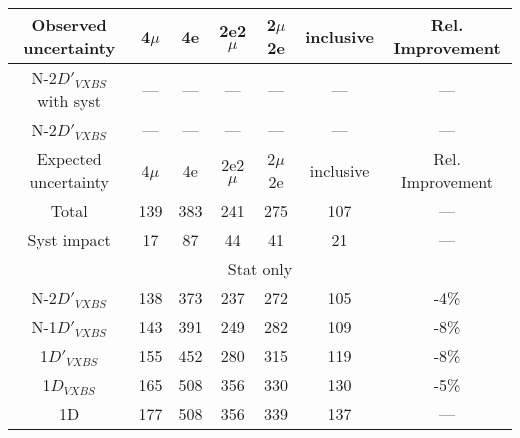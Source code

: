 \begin{table}[ht]	
\begin{center}
    \begin{tabular}{ccccccc}
    \hline			
    Observed uncertainty	&	4$\mu$	&	4e	&	2e2$\mu$	&2$\mu$2e	& inclusive & Rel. Improvement \\
    \hline			
    N-2$D'_{VXBS}$ with syst	&	---	&	---	&	---	&	---	&	---	&	---	\\
    N-2$D'_{VXBS}$	&	---	&	---	&	---	&	---	&	---	&	---	\\
    \hline			
    \hline			
    Expected uncertainty	&	4$\mu$	&	4e	&	2e2$\mu$	&2$\mu$2e	& inclusive & Rel. Improvement \\
    \hline			
    Total	&	139	&	383	&	241	&	275	&	107	&	---	\\
    \hline
    Syst impact	&	17	&	87	&	44	&	41	&	21	&	---	\\
    \hline
    \multicolumn{7}{c}{Stat only}\\
    \hline
        N-2$D'_{VXBS}$	&	138	&	373	&	237	&	272	&	105	&	-4\%	\\
        N-1$D'_{VXBS}$	&	143	&	391	&	249	&	282	&	109	&	-8\%	\\
        1$D'_{VXBS}$	&	155	&	452	&	280	&	315	&	119	&	-8\%	\\
        1$D_{VXBS}$	&	165	&	508	&	356	&	330	&	130	&	-5\%	\\
        1D	&	177	&	508	&	356	&	339	&	137	&	---	\\
    \hline			
    \end{tabular}
    \label{table:2D_refit_result_finals}
\end{center}
\end{table}

